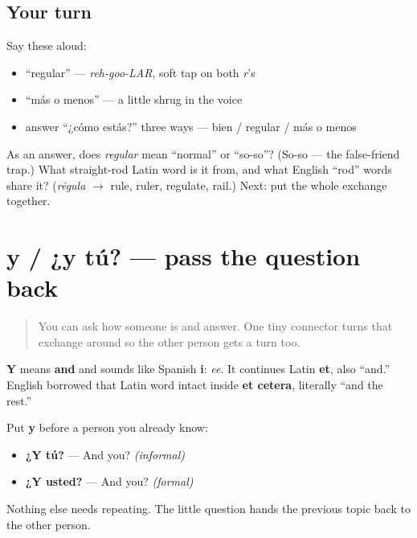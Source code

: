 \subsection*{Your turn}
Say these aloud:

\begin{itemize}
\raggedright
  \item \textquotedblleft{}regular\textquotedblright{} — \emph{reh-goo-LAR}, soft tap on both \emph{r}'s
  \item \textquotedblleft{}más o menos\textquotedblright{} — a little shrug in the voice
  \item answer \textquotedblleft{}¿cómo estás?\textquotedblright{} three ways — bien / regular / más o menos
\end{itemize}

\begin{tcolorbox}[breakable,colback=teal!4,colframe=teal!35!black,title={Before you move on}]
As an answer, does \emph{regular} mean \textquotedblleft{}normal\textquotedblright{} or \textquotedblleft{}so-so\textquotedblright{}? (So-so — the false-friend trap.) What straight-rod Latin word is it from, and what English \textquotedblleft{}rod\textquotedblright{} words share it? (\emph{rēgula} $\to$ rule, ruler, regulate, rail.) Next: put the whole exchange together.
\end{tcolorbox}
\section[y / ¿y tú?]{y / ¿y tú? — pass the question back}

\label{lesson:ES-C04-y}



\begin{quote}
You can ask how someone is and answer. One tiny connector turns that exchange around so the other person gets a turn too.
\end{quote}

\begin{cousinweb}
\textbf{Y} means \textbf{and} and sounds like Spanish \textbf{i}: \emph{ee}. It continues Latin \textbf{et}, also “and.” English borrowed that Latin word intact inside \textbf{et cetera}, literally “and the rest.”
\end{cousinweb}

\begin{grammarlens}[title={Grammar Lens: the shortest return question}]
Put \textbf{y} before a person you already know:

\begin{itemize}
\raggedright
  \item \textbf{¿Y tú?} — And you? \emph{(informal)}
  \item \textbf{¿Y usted?} — And you? \emph{(formal)}
\end{itemize}

Nothing else needs repeating. The little question hands the previous topic back to the other person.
\end{grammarlens}

